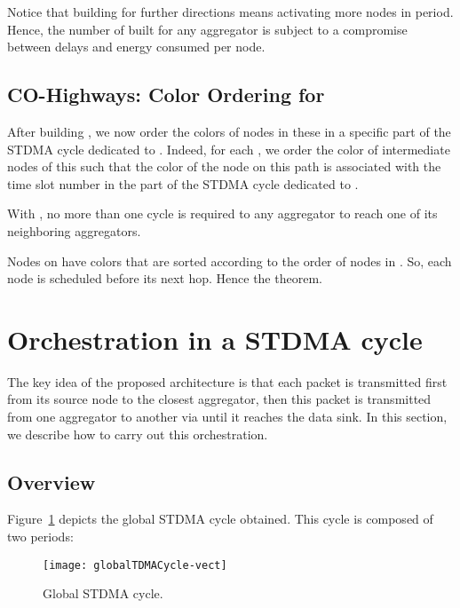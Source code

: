\begin{remark}
Notice that building  for further directions means activating more nodes in  period. 
Hence, the number of built  for any aggregator is subject to a compromise between delays and energy consumed per node. 
\end{remark}


\subsection{CO-Highways: Color Ordering for }
After building , we now order the colors of nodes in these  in a specific part of the STDMA cycle dedicated to . Indeed, for each , we order the color of intermediate nodes of this  such that the color of the  node on this path is associated with the time slot number  in the part of the STDMA cycle dedicated to . 

\begin{theorem}
With , no more than one cycle is required to any aggregator to reach one of its neighboring aggregators.
\end{theorem}
\proof
Nodes on  have colors that are sorted according to the order of nodes in . So, each node is scheduled before its next hop. Hence the theorem.
\endproof


\section{Orchestration in a STDMA cycle}\label{sec:orchestration}
The key idea of the proposed architecture is that each packet is transmitted first from its source node to the closest aggregator, then this packet is transmitted from one aggregator to another via  until it reaches the data sink. 
In this section, we describe how to carry out this orchestration. 
\subsection{Overview}
Figure~\ref{fig:globalTDMA} depicts the global STDMA cycle obtained. This cycle is composed of two periods:
\begin{figure}[H]
\centering
\texttt{[image: globalTDMACycle-vect]}
\caption{Global STDMA cycle.\label{fig:globalTDMA}}
\end{figure}

